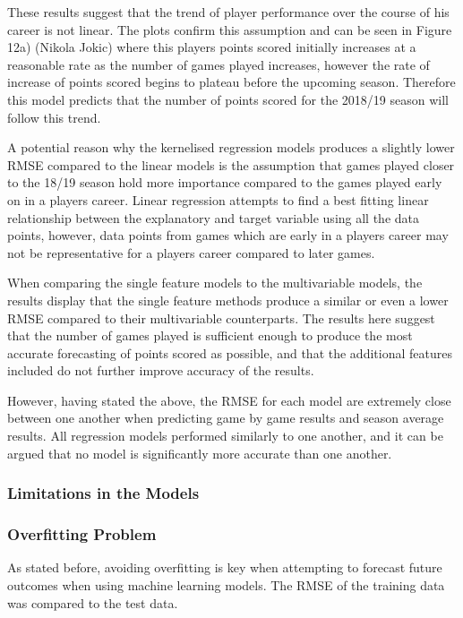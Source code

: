 \documentclass[a4paper,11pt,twoside]{article}
\begin{document}
These results suggest that the trend of player performance over the course of his career is not linear. The plots confirm this assumption and can be seen in Figure 12a) (Nikola Jokic) where this players points scored initially increases at a reasonable rate as the number of games played increases, however the rate of increase of points scored begins to plateau before the upcoming season. Therefore this model predicts that the number of points scored for the 2018/19 season will follow this trend.

A potential reason why the kernelised regression models produces a slightly lower RMSE compared to the linear models is the assumption that games played closer to the 18/19 season hold more importance compared to the games played early on in a players career. Linear regression attempts to find a best fitting linear relationship between the explanatory and target variable using all the data points, however, data points from games which are early in a players career may not be representative for a players career compared to later games.

When comparing the single feature models to the multivariable models, the results display that the single feature methods produce a similar or even a lower RMSE compared to their multivariable counterparts. The results here suggest that the number of games played is sufficient enough to produce the most accurate forecasting of points scored as possible, and that the additional features included do not further improve accuracy of the results.

However, having stated the above, the RMSE for each model are extremely close between one another when predicting game by game results and season average results. All regression models performed similarly to one another, and it  can be argued that no model is significantly more accurate than one another.

\subsubsection{Limitations in the Models}

\subsubsection{Overfitting Problem}
As stated before, avoiding overfitting is key when attempting to forecast future outcomes when using machine learning models. The RMSE of the training data was compared to the test data.
\end{document}
